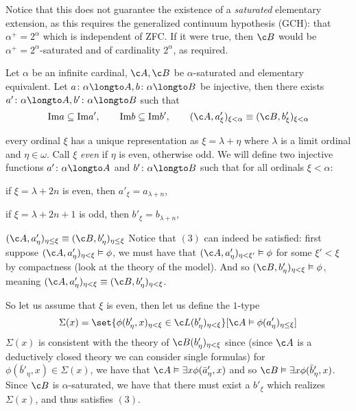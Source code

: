 Notice that this does not guarantee the existence of a {\it saturated} elementary extension, as this requires the generalized continuum hypothesis (GCH): that $\alpha^+=2^\alpha$ which is independent of
ZFC.
If it were true, then $\c B$ would be $\alpha^+=2^\alpha$-saturated and of cardinality $2^\alpha$, as required.

\blemm[title=Shuttle Lemma]

    Let $\alpha$ be an infinite cardinal, $\c A,\c B$ be $\alpha$-saturated and elementary equivalent.
    Let $a\colon\alpha\longto A,b\colon\alpha\longto B$ be injective, then there exists $a'\colon\alpha\longto A,b'\colon\alpha\longto B$ such that
    $$ {\rm Im}a \subseteq {\rm Im}a',\qquad {\rm Im}b \subseteq {\rm Im}b',\qquad (\c A,a'_\xi)_{\xi<\alpha} \equiv (\c B,b'_\xi)_{\xi<\alpha} $$

\elemm

\Proof every ordinal $\xi$ has a unique representation as $\xi=\lambda+\eta$ where $\lambda$ is a limit ordinal and $\eta\in\omega$.
Call $\xi$ {\it even} if $\eta$ is even, otherwise odd.
We will define two injective functions $a'\colon\alpha\longto A$ and $b'\colon\alpha\longto B$ such that for all ordinals $\xi<\alpha$:
\benum
    \item if $\xi=\lambda+2n$ is even, then $a'_\xi=a_{\lambda+n}$,
    \item if $\xi=\lambda+2n+1$ is odd, then $b'_\xi=b_{\lambda+n}$,
    \item $(\c A,a'_\eta)_{\eta\leq\xi}\equiv(\c B,b'_\eta)_{\eta\leq\xi}$
\eenum
Notice that $(3)$ can indeed be satisfied: first suppose $(\c A,a'_\eta)_{\eta<\xi}\vDash\phi$, we must have that $(\c A,a'_\eta)_{\eta<\xi'}\vDash\phi$ for some $\xi'<\xi$ by compactness (look at the
theory of the model).
And so $(\c B,b'_\eta)_{\eta<\xi}\vDash\phi$, meaning $(\c A,a'_\eta)_{\eta<\xi}\equiv(\c B,b'_\eta)_{\eta<\xi}$.

So let us assume that $\xi$ is even, then let us define the $1$-type
$$ \Sigma(x) = \set{\phi(b'_\eta,x)_{\eta<\xi}\in\c L(b'_\eta)_{\eta<\xi}}[\c A\vDash\phi(a'_\eta)_{\eta\leq\xi}] $$
$\Sigma(x)$ is consistent with the theory of $\c B(b'_\eta)_{\eta<\xi}$ since (since $\c A$ is a deductively closed theory we can consider single formulas) for $\phi(\bar b'_\eta,x)\in\Sigma(x)$,
we have that $\c A\vDash\exists x\phi(\bar a'_\eta,x)$ and so $\c B\vDash\exists x\phi(\bar b'_\eta,x)$.
Since $\c B$ is $\alpha$-saturated, we have that there must exist a $b'_\xi$ which realizes $\Sigma(x)$, and thus satisfies $(3)$.

